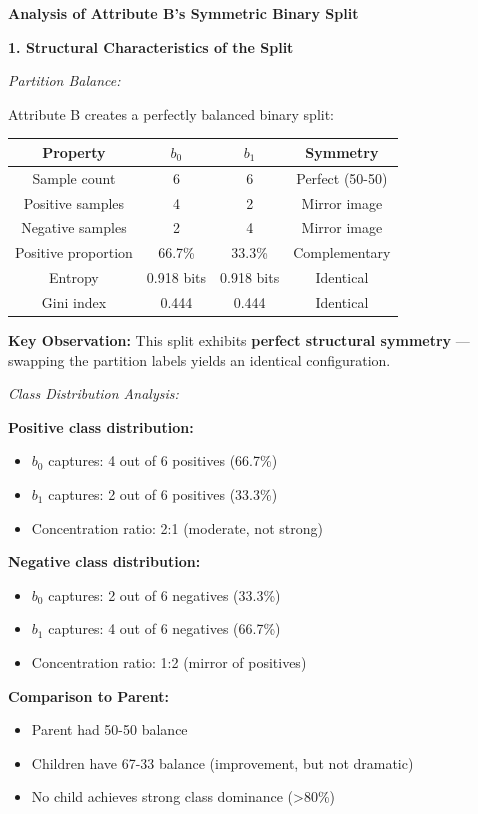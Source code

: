 \documentclass[12pt]{article}
\begin{document}
\begin{explanation}
\textbf{Analysis of Attribute B's Symmetric Binary Split}

\textbf{1. Structural Characteristics of the Split}

\textit{Partition Balance:}

Attribute B creates a perfectly balanced binary split:

\begin{center}
\begin{tabular}{|c|c|c|c|}
\hline
\textbf{Property} & \textbf{$b_0$} & \textbf{$b_1$} & \textbf{Symmetry} \\
\hline
Sample count & 6 & 6 & Perfect (50-50) \\
Positive samples & 4 & 2 & Mirror image \\
Negative samples & 2 & 4 & Mirror image \\
Positive proportion & 66.7\% & 33.3\% & Complementary \\
Entropy & 0.918 bits & 0.918 bits & Identical \\
Gini index & 0.444 & 0.444 & Identical \\
\hline
\end{tabular}
\end{center}

\textbf{Key Observation:} This split exhibits \textbf{perfect structural symmetry} — swapping the partition labels yields an identical configuration.

\textit{Class Distribution Analysis:}

\textbf{Positive class distribution:}
\begin{itemize}
    \item $b_0$ captures: 4 out of 6 positives (66.7\%)
    \item $b_1$ captures: 2 out of 6 positives (33.3\%)
    \item Concentration ratio: 2:1 (moderate, not strong)
\end{itemize}

\textbf{Negative class distribution:}
\begin{itemize}
    \item $b_0$ captures: 2 out of 6 negatives (33.3\%)
    \item $b_1$ captures: 4 out of 6 negatives (66.7\%)
    \item Concentration ratio: 1:2 (mirror of positives)
\end{itemize}

\textbf{Comparison to Parent:}
\begin{itemize}
    \item Parent had 50-50 balance
    \item Children have 67-33 balance (improvement, but not dramatic)
    \item No child achieves strong class dominance (\textgreater80\%)
\end{itemize}


\end{explanation}
\end{document}

